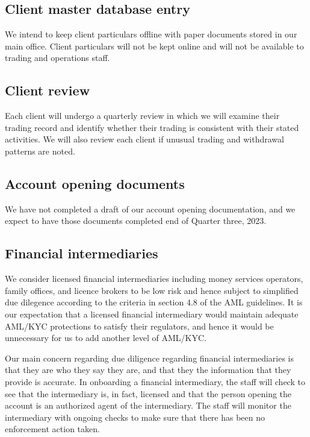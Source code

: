 \subsection{Client master database entry}
We intend to keep client particulars offline with paper documents
stored in our main office.  Client particulars will not be kept online
and will not be available to trading and operations staff.

\subsection{Client review}
Each client will undergo a quarterly review in which we will examine
their trading record and identify whether their trading is
consistent with their stated activities.  We will also review each
client if unusual trading and withdrawal patterns are noted.

\subsection{Account opening documents}
We have not completed a draft of our account opening documentation, and
we expect to have those documents completed end of Quarter three, 2023.

\subsection{Financial intermediaries}

We consider licensed financial intermediaries including money services
operators, family offices, and licence brokers to be low risk and
hence subject to simplified due dilegence according to the criteria in
section 4.8 of the AML guidelines.  It is our expectation that a
licensed financial intermediary would maintain adequate AML/KYC
protections to satisfy their regulators, and hence it would be
unnecessary for us to add another level of AML/KYC.

Our main concern regarding due diligence regarding financial
intermediaries is that they are who they say they are, and that they
the information that they provide is accurate.  In onboarding a
financial intermediary, the staff will check to see that the
intermediary is, in fact, licensed and that the person opening the
account is an authorized agent of the intermediary.  The staff will
monitor the intermediary with ongoing checks to make sure that there
has been no enforcement action taken.

